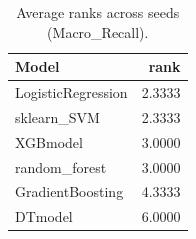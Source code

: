 \begin{table}[t]
\centering
\begin{tabular}{lr}
\toprule
Model & rank \\
\midrule
LogisticRegression & 2.3333 \\
sklearn_SVM & 2.3333 \\
XGBmodel & 3.0000 \\
random_forest & 3.0000 \\
GradientBoosting & 4.3333 \\
DTmodel & 6.0000 \\
\bottomrule
\end{tabular}
\caption{Average ranks across seeds (Macro_Recall).}
\label{tab:avg_rank_Macro_Recall}
\end{table}